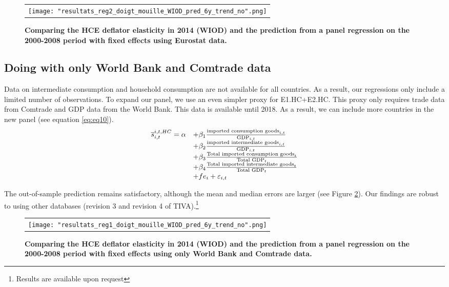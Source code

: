 \documentclass[12pt,a4paper]{paper}
\begin{document}
\begin{figure}[H]
	\centering
	\caption{\footnotesize{\textbf{Comparing the HCE deflator elasticity in 2014 (WIOD) and the prediction from a panel regression on the 2000-2008 period with fixed effects using Eurostat data.}}}
	\begin{tabular}{c}
		\texttt{[image: "resultats\_reg2\_doigt\_mouille\_WIOD\_pred\_6y\_trend\_no".png]}\\
	\end{tabular}
	\label{fig:panel_pred1}
\end{figure}

\subsection{Doing with only World Bank and Comtrade data}
Data on intermediate consumption and household consumption are not available for all countries.
As a result, our regressions only include a limited number of observations.
To expand our panel, we use an even simpler proxy for E1.HC+E2.HC. 
This proxy only requires trade data from Comtrade and GDP data from the World Bank. This data is available until 2018. 
As a result, we can include more countries in the new panel (see equation \ref{eq:eq10}).
 \begin{equation}
\begin{array}{llll}
\overline{s}_{i,t}^{i,t,HC}= \alpha & +  \beta_1  \frac{\textnormal{imported consumption goods}_{i,t}}{\textnormal{GDP}_{i,t}} \\ & + \beta_2 \frac{\textnormal{imported intermediate goods}_{i,t}}{\textnormal{GDP}_{i,t}} \\
& +  \beta_3  \frac{\textnormal{Total imported consumption goods}_{t}}{\textnormal{Total GDP}_{t}} \\
& + \beta_4 \frac{\textnormal{Total imported intermediate goods}_{t}}{\textnormal{Total GDP}_{t}} \\
& +fe_{i}+\varepsilon_{i,t}
\end{array}
\label{eq:eq10}
\end{equation}

The out-of-sample prediction remains satisfactory, although the mean and median errors are larger (see Figure \ref{fig:panel_pred2}). 
Our findings are robust to using other databases (revision 3 and revision 4 of TIVA).\footnote{Results are available upon request}


\begin{figure}[!h]
	\centering
	\caption{\footnotesize{\textbf{Comparing the HCE deflator elasticity in 2014 (WIOD) and the prediction from a panel regression on the 2000-2008 period with fixed effects using only World Bank and Comtrade data. }}}
	\begin{tabular}{c}
		\texttt{[image: "resultats\_reg1\_doigt\_mouille\_WIOD\_pred\_6y\_trend\_no".png]}\\
	\end{tabular}
	\label{fig:panel_pred2}
\end{figure}
\end{document}
